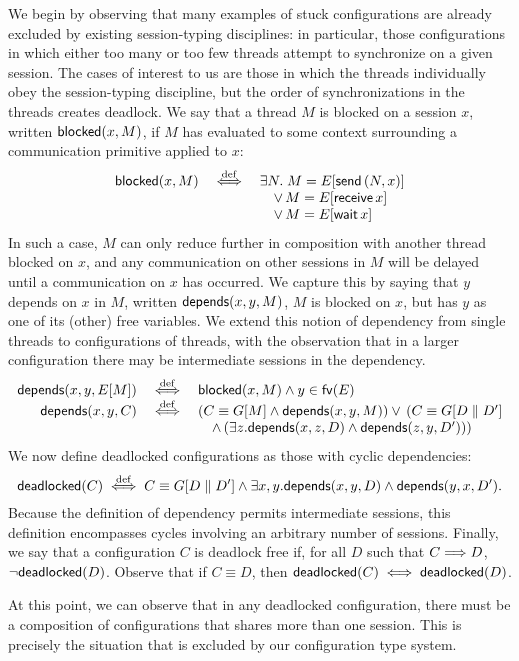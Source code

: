 \documentclass[oribibl,orivec,envcountsame]{llncs}
\begin{document}
We begin by observing that many examples of stuck configurations are already excluded by existing
session-typing disciplines: in particular, those configurations in which either too many or too few
threads attempt to synchronize on a given session.  The cases of interest to us are those in which
the threads individually obey the session-typing discipline, but the order of synchronizations in
the threads creates deadlock.  We say that a thread $M$ is blocked on a session $x$, written
$\mathsf{blocked}(x,M)$, if $M$ has evaluated to some context surrounding a communication primitive applied
to $x$:
%
\[\begin{array}{rcl}
  \mathsf{blocked}(x,M) &\stackrel{\mathrm{def}}{\iff}& \exists N. \; M = E[\mathsf{send} \, (N,x)] \\
  && \quad \lor \, M = E[\mathsf{receive} \, x] \\
  && \quad \lor \, M = E[\mathsf{wait} \, x]
\end{array}\]
%
In such a case, $M$ can only reduce further in composition with another thread blocked on $x$, and
any communication on other sessions in $M$ will be delayed until a communication on $x$ has
occurred.  We capture this by saying that $y$ depends on $x$ in $M$, written $\mathsf{depends}(x,y,M)$, $M$ is
blocked on $x$, but has $y$ as one of its (other) free variables.  We extend this notion of
dependency from single threads to configurations of threads, with the observation that in a larger
configuration there may be intermediate sessions in the dependency.
\[\begin{array}{rcl}
  \mathsf{depends}(x,y,E[M]) &\stackrel{\mathrm{def}}{\iff}& \mathsf{blocked}(x,M) \land y \in \mathsf{fv}(E) \\
  \mathsf{depends}(x,y,C) &\stackrel{\mathrm{def}}{\iff}& (C \equiv G[M] \land \mathsf{depends}(x,y,M)) \lor \, (C \equiv G[D \parallel D'] \\
  && \quad \land \, (\exists z. \mathsf{depends}(x,z,D) \land \mathsf{depends}(z,y,D')))
\end{array}\]
%
We now define deadlocked configurations as those with cyclic dependencies:
%
\[
\mathsf{deadlocked}(C) \stackrel{\mathrm{def}}{\iff} C \equiv G[D \parallel D'] \land \exists x,y. \mathsf{depends}(x,y,D) \land \mathsf{depends}(y,x,D').
\]
%
Because the definition of dependency permits intermediate sessions, this definition encompasses
cycles involving an arbitrary number of sessions.  Finally, we say that a configuration $C$ is
deadlock free if, for all $D$ such that $C \Longrightarrow D$, $\lnot\mathsf{deadlocked}(D)$.  Observe that if
$C \equiv D$, then $\mathsf{deadlocked}(C) \iff \mathsf{deadlocked}(D)$.

At this point, we can observe that in any deadlocked configuration, there must be a composition of
configurations that shares more than one session.  This is precisely the situation that is excluded
by our configuration type system.
\end{document}
